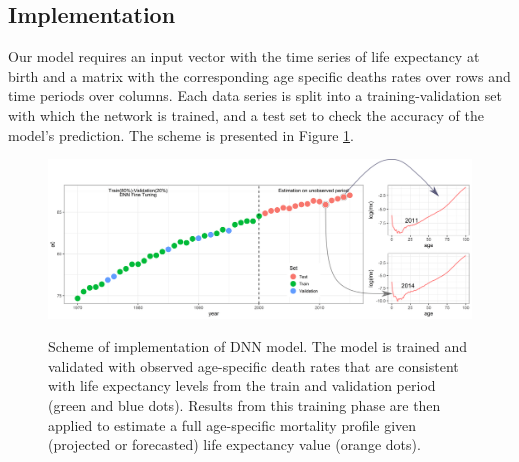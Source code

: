 \documentclass[a4,11pt]{article}
\begin{document}
\subsection*{Implementation}
Our model requires an input vector with the time series of life expectancy at birth and a matrix with the corresponding age specific deaths rates over rows and time periods over columns. Each data series is split into a training-validation set with which the network is trained, and a test set to check the accuracy of the model's prediction. The scheme is presented in Figure \ref{fig:scheme}.

\begin{figure}[H]
	\centering
	\includegraphics[width=1\linewidth]{tr_val_ts}\\
	 \caption{Scheme of implementation of DNN model. The model is trained and validated with observed age-specific death rates that are consistent with life expectancy levels from the train and validation period (green and blue dots). Results from this training phase are then applied to estimate a full age-specific mortality profile given (projected or forecasted) life expectancy value (orange dots).}
	 \label{fig:scheme}
\end{figure}
\end{document}
